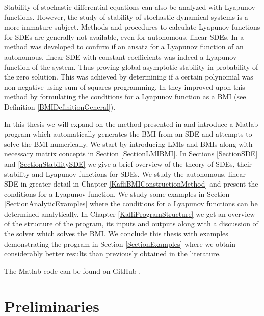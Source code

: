 \documentclass[a4paper,12pt,twoside,BCOR=10mm]{scrbook}
\begin{document}
Stability of stochastic differential equations can also be analyzed with Lyapunov functions. However, the study of stability of stochastic dynamical systems is a more immature subject. Methods and procedures to calculate Lyapunov functions for SDEs are generally not available, even for autonomous, linear SDEs. In \citep{HGGS2018localLya} a method was developed to confirm if an ansatz for a Lyapunov function of an autonomous, linear SDE with constant coefficients was indeed a Lyapunov function of the system. Thus proving global asymptotic stability in probability of the zero solution. This was achieved by determining if a certain polynomial was non-negative using sum-of-squares programming. In \citep{Ha2019BMI} they improved upon this method by formulating the conditions for a Lyapunov function as a BMI (see Definition \ref{BMIDefinitionGeneral}).

In this thesis we will expand on the method presented in \citep{Ha2019BMI} and introduce a Matlab program which automatically generates the BMI from an SDE and attempts to solve the BMI numerically. We start by introducing LMIs and BMIs along with necessary matrix concepts in Section \ref{SectionLMIBMI}. In Sections \ref{SectionSDE} and \ref{SectionStabilitySDE} we give a brief overview of the theory of SDEs, their stability and Lyapunov functions for SDEs. We study the autonomous, linear SDE in greater detail in Chapter \ref{KafliBMIConstructionMethod} and present the conditions for a Lyapunov function. We study some examples in Section \ref{SectionAnalyticExamples} where the conditions for a Lyapunov functions can be determined analytically. In Chapter \ref{KafliProgramStructure} we get an overview of the structure of the program, its inputs and outputs along with a discussion of the solver which solves the BMI. We conclude this thesis with examples demonstrating the program in Section \ref{SectionExamples} where we obtain considerably better results than previously obtained in the literature.

The Matlab code can be found on GitHub \citep{Mverk2022}.

\chapter{Preliminaries}\label{KafliLMI&BMI}
\end{document}
